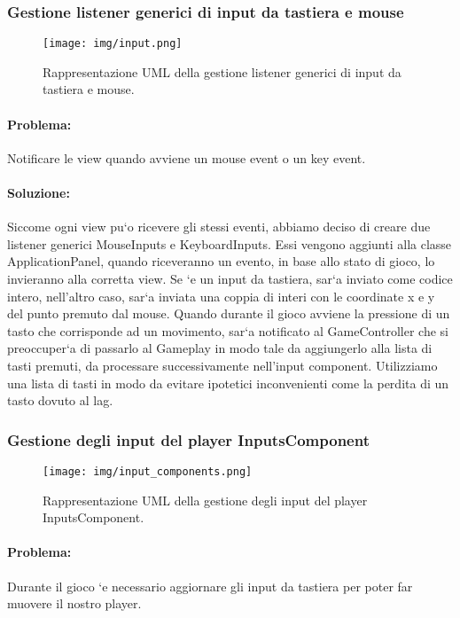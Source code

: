 \subsubsection{Gestione listener generici di input da tastiera e mouse}

\begin{figure}[H]
\centering{}
\texttt{[image: img/input.png]}
\caption{Rappresentazione UML della gestione listener generici di input da tastiera e mouse.}
\end{figure}

\paragraph{Problema:}
Notificare le view quando avviene un mouse event o un key event.

\paragraph{Soluzione:}
Siccome ogni view pu`o ricevere gli stessi eventi, abbiamo deciso di creare due listener generici MouseInputs e KeyboardInputs. Essi vengono aggiunti alla classe ApplicationPanel, quando riceveranno un evento, in base allo stato di gioco, lo invieranno alla corretta view. Se `e un input da tastiera, sar`a inviato come codice intero, nell’altro caso, sar`a inviata una coppia di interi con le coordinate x e y del punto premuto dal mouse. Quando durante il gioco avviene la pressione di un tasto che corrisponde ad un movimento, sar`a notificato al GameController che si preoccuper`a di passarlo al Gameplay in modo tale da aggiungerlo alla lista di tasti premuti, da processare successivamente nell’input component. Utilizziamo una lista di tasti in modo da evitare ipotetici inconvenienti come la perdita di un tasto dovuto al lag.

\subsubsection{Gestione degli input del player InputsComponent}

\begin{figure}[H]
\centering{}
\texttt{[image: img/input\_components.png]}
\caption{Rappresentazione UML della gestione degli input del player InputsComponent.}
\end{figure}

\paragraph{Problema:}
Durante il gioco `e necessario aggiornare gli input da tastiera per poter far muovere il nostro player.

